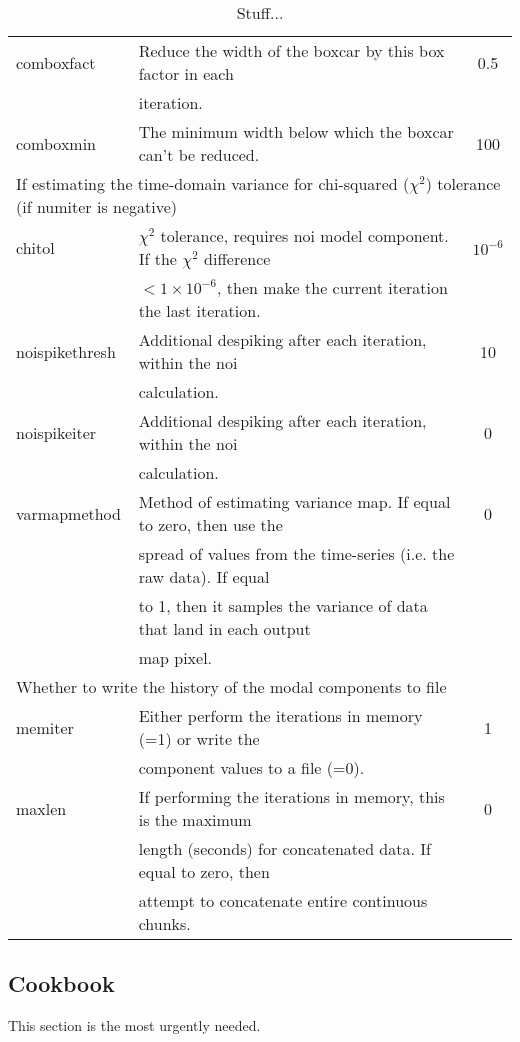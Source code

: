 \documentclass[twoside,11pt]{article}
\newcommand{\xlabel}[1]{}
\renewcommand{\_}{\texttt{\symbol{95}}}
\begin{document}
\begin{table}
\begin{tabular}{llc}
com\_boxfact         &    Reduce the width of the boxcar by this box factor in each        &   0.5 \\
                     &   iteration.                                                        & \\
com\_boxmin          &   The minimum width below which the boxcar can't be reduced.        & 100 \\
\hline
\multicolumn{3}{l}{If estimating the time-domain variance for chi-squared ($\chi^2$) tolerance (if numiter is negative)} \\
\hline
chitol            &   $\chi^2$ tolerance, requires noi model component. If the $\chi^2$ difference & $10^{-6}$\\
                  &   $<1\times10^{-6}$, then make the current iteration the last iteration.       & \\
noispikethresh    &   Additional despiking after each iteration, within the noi                    & 10 \\
                  &   calculation.                                                                 & \\
noispikeiter      &   Additional despiking after each iteration, within the noi                    & 0 \\
                  &   calculation.                                                                 & \\
varmapmethod      &   Method of estimating variance map. If equal to zero, then use the            & 0 \\
                  &   spread of values from the time-series (i.e. the raw data). If equal          & \\
                  &   to 1, then it samples the variance of data that land in each output          & \\
                  &   map pixel.                                                                   & \\
\hline
\multicolumn{3}{l}{Whether to write the history of the modal components to file} \\
\hline
memiter           &   Either perform the iterations in memory (=1) or write the       &    1 \\
                  &   component values to a file (=0).                                & \\
maxlen            &   If performing the iterations in memory, this is the maximum     &    0 \\
                  &   length (seconds) for concatenated data. If equal to zero, then  & \\
                  &   attempt to concatenate entire continuous chunks.                & \\
\hline
\end{tabular}
\caption{Stuff...}
\end{table}

\subsection{\xlabel{scuba2cookbook}Cookbook}

This section is the most urgently needed.

\end{document}
